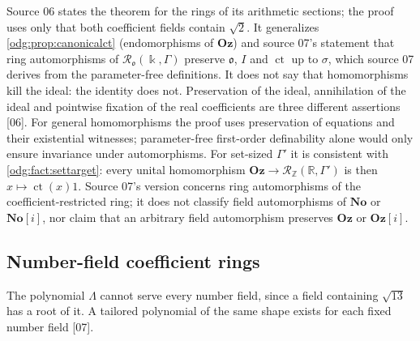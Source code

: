 \documentclass[11pt,oneside]{article}
\numberwithin{equation}{section}
\theoremstyle{definition}
\theoremstyle{remark}
\newcommand{\No}{\mathbf{No}}
\newcommand{\Oz}{\mathbf{Oz}}
\newcommand{\Z}{\mathbb Z}
\newcommand{\R}{\mathbb R}
\newcommand{\ct}{\operatorname{ct}}
\newcommand{\src}[1]{\textup{\textsf{\small[#1]}}}
\newcommand{\Og}{\Oz[i]}
\begin{document}
Source 06 states the theorem for the rings of its arithmetic sections; the
proof uses only that both coefficient fields contain $\sqrt2$. It generalizes
\cref{odg:prop:canonicalct} (endomorphisms of $\Oz$) and source 07's statement
that ring automorphisms of $\mathcal R_{\mathfrak o}(\Bbbk,\Gamma)$ preserve
$\mathfrak o$, $I$ and $\ct$ up to $\sigma$, which source 07 derives from the
parameter-free definitions. It does not say that homomorphisms kill the ideal:
the identity does not. Preservation of the ideal, annihilation of the ideal and
pointwise fixation of the real coefficients are three different assertions
\src{06}. For general homomorphisms the proof uses preservation of
equations and their existential witnesses; parameter-free first-order
definability alone would only ensure invariance under automorphisms.
For set-sized $\Gamma'$ it is consistent with
\cref{odg:fact:settarget}: every unital homomorphism
$\Oz\to\mathcal R_\Z(\R,\Gamma')$ is then $x\mapsto\ct(x)1$. Source 07's
version concerns ring automorphisms of the coefficient-restricted ring; it
does not classify field automorphisms of $\No$ or $\No[i]$, nor claim that an
arbitrary field automorphism preserves $\Oz$ or $\Og$.

\subsection{Number-field coefficient rings}

The polynomial $\Lambda$ cannot serve every number field, since a field
containing $\sqrt{13}$ has a root of it. A tailored polynomial of the same
shape exists for each fixed number field \src{07}.
\end{document}
